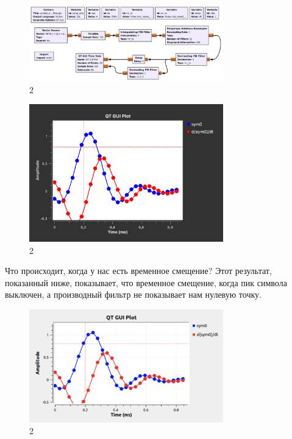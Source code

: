 \documentclass[10pt,a4paper,oneside]{article}
\begin{document}
\begin{figure}[H]
        \centering
        \includegraphics[width=0.75\textwidth]{pics/10.png}
        \caption{2}
        \label{fig:first}
\end{figure}

\begin{figure}[H]
        \centering
        \includegraphics[width=0.75\textwidth]{pics/11.png}
        \caption{2}
        \label{fig:first}
\end{figure}

Что происходит, когда у нас есть временное смещение? Этот результат, показанный ниже, показывает, что временное смещение, когда пик символа выключен, а производный фильтр не показывает нам нулевую точку.

\begin{figure}[H]
        \centering
        \includegraphics[width=0.75\textwidth]{pics/12.png}
        \caption{2}
        \label{fig:first}
\end{figure}
\end{document}
